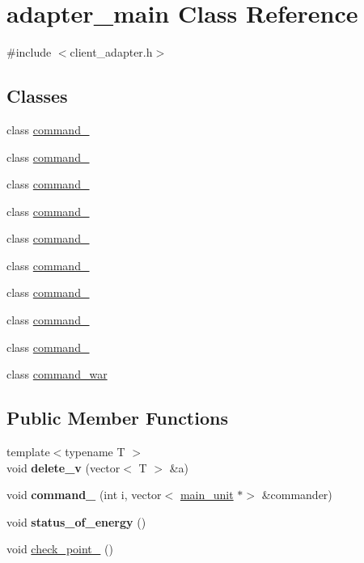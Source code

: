 \hypertarget{classadapter__main}{}\section{adapter\+\_\+main Class Reference}
\label{classadapter__main}


{\ttfamily \#include $<$client\+\_\+adapter.\+h$>$}

\subsection*{Classes}
\begin{DoxyCompactItemize}
\item 
class \mbox{\hyperlink{classadapter__main_1_1command__1}{command\+\_}}
\item 
class \mbox{\hyperlink{classadapter__main_1_1command__2}{command\+\_}}
\item 
class \mbox{\hyperlink{classadapter__main_1_1command__3}{command\+\_}}
\item 
class \mbox{\hyperlink{classadapter__main_1_1command__4}{command\+\_}}
\item 
class \mbox{\hyperlink{classadapter__main_1_1command__5}{command\+\_}}
\item 
class \mbox{\hyperlink{classadapter__main_1_1command__6}{command\+\_}}
\item 
class \mbox{\hyperlink{classadapter__main_1_1command__7}{command\+\_}}
\item 
class \mbox{\hyperlink{classadapter__main_1_1command__8}{command\+\_}}
\item 
class \mbox{\hyperlink{classadapter__main_1_1command__9}{command\+\_}}
\item 
class \mbox{\hyperlink{classadapter__main_1_1command__war}{command\+\_\+war}}
\end{DoxyCompactItemize}
\subsection*{Public Member Functions}
\begin{DoxyCompactItemize}
\item 
\mbox{\label{classadapter__main_a318dc38638b55e1d4c9b37191dacdd4c}} 
{\footnotesize template$<$typename T $>$ }\\void {\bfseries delete\+\_\+v} (vector$<$ T $>$ \&a)
\item 
\mbox{\label{classadapter__main_a382b95c66813f5ff3a98dbcf7bca385e}} 
void {\bfseries command\+\_} (int i, vector$<$ \mbox{\hyperlink{classmain__unit}{main\+\_\+unit}} $\ast$$>$ \&commander)
\item 
\mbox{\label{classadapter__main_aaf194ce5d086b23c472a5fb54cd2557f}} 
void {\bfseries status\+\_\+of\+\_\+energy} ()
\item 
void \mbox{\hyperlink{classadapter__main_a107eff404526bd331801946b03a951f0}{check\+\_\+point\+\_}} ()
\end{DoxyCompactItemize}
